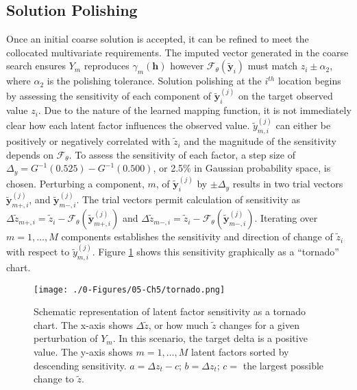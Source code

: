 \subsection{Solution Polishing}
\label{subsec:05polish}

Once an initial coarse solution is accepted, it can be refined to meet the collocated multivariate requirements. The imputed vector generated in the coarse search ensures $Y_{m}$ reproduces $\gamma_{m}(\mathbf{h})$ however $\mathcal{F}_{\theta}(\tilde{\mathbf{y}}_{i})$ must match $z_{i} \pm \alpha_{2}$, where $\alpha_{2}$ is the polishing tolerance. Solution polishing at the $i^{th}$ location begins by assessing the sensitivity of each component of  $\tilde{\mathbf{y}}_{i}^{(j)}$ on the target observed value $z_{i}$. Due to the nature of the learned mapping function, it is not immediately clear how each latent factor influences the observed value. $\tilde{y}_{m, i}^{(j)}$ can either be positively or negatively correlated with $\tilde{z}_{i}$ and the magnitude of the sensitivity depends on $\mathcal{F}_{\theta}$. To assess the sensitivity of each factor, a step size of $\Delta_{y} = G^{-1}(0.525)-G^{-1}(0.500)$, or 2.5\% in Gaussian probability space, is chosen. Perturbing a component, $m$, of $\tilde{\mathbf{y}}^{(j)}_{i}$ by $\pm \Delta_{y}$ results in two trial vectors $\tilde{\mathbf{y}}_{m+, i}^{(j)}$, and $\tilde{\mathbf{y}}_{m-,i}^{(j)}$. The trial vectors permit calculation of sensitivity as  $\Delta\tilde{z}_{m+,i} = \tilde{z}_{i} - \mathcal{F}_{\theta}(\tilde{\mathbf{y}}_{m+, i}^{(j)})$ and $\Delta\tilde{z}_{m-,i} = \tilde{z}_{i} - \mathcal{F}_{\theta}(\tilde{\mathbf{y}}_{m-,i}^{(j)})$. Iterating over $m=1,\dots,M$ components establishes the sensitivity and direction of change of $\tilde{z}_{i}$ with respect to $\tilde{y}_{m, i}^{(j)}$. Figure \ref{fig:tornado} shows this sensitivity graphically as a ``tornado'' chart.

\begin{figure}[htb!]
    \centering
    \texttt{[image: ./0-Figures/05-Ch5/tornado.png]}
    \caption{Schematic representation of latent factor sensitivity as a tornado chart. The x-axis shows $\Delta \tilde{z}$, or how much $\tilde{z}$ changes for a given perturbation of $Y_{m}$. In this scenario, the target delta is a positive value. The y-axis shows $m=1,\dots,M$ latent factors sorted by descending sensitivity. $a = \Delta z_{t} - c$; $b=\Delta z_{t}$; $c=$ the largest possible change to $\tilde{z}$.}
    \label{fig:tornado}
\end{figure}

